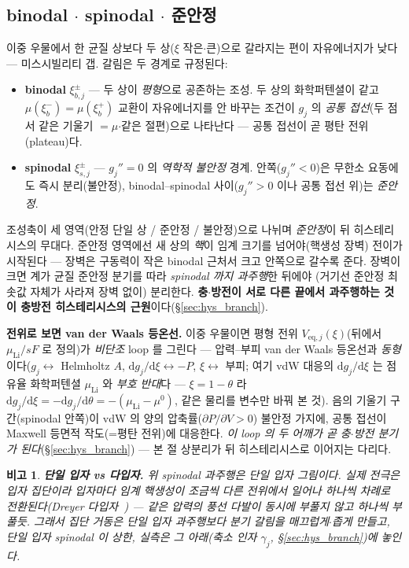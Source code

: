\documentclass[11pt,a4paper]{article}
\newtheorem*{flagbox}{비고}
\newcommand{\dd}{\mathrm{d}}
\newcommand{\eq}{\mathrm{eq}}
\begin{document}
\subsection{binodal $\cdot$ spinodal $\cdot$ 준안정}
이중 우물에서 한 균질 상보다 두 상($\xi$ 작은$\cdot$큰)으로 갈라지는 편이 자유에너지가 낮다 — 미스시빌리티 갭.
갈림은 두 경계로 규정된다:
\begin{itemize}[leftmargin=1.4em,itemsep=2pt]
\item \textbf{binodal} $\xi_{b,j}^\pm$ — 두 상이 \emph{평형}으로 공존하는 조성. 두 상의 화학퍼텐셜이 같고
  $\mu(\xi_b^-)=\mu(\xi_b^+)$ 교환이 자유에너지를 안 바꾸는 조건이 $g_j$ 의 \emph{공통 접선}(두 점서 같은 기울기
  $=\mu$$\cdot$같은 절편)으로 나타난다 — 공통 접선이 곧 평탄 전위(plateau)다.
\item \textbf{spinodal} $\xi_{s,j}^\pm$ — $g_j''=0$ 의 \emph{역학적 불안정} 경계. 안쪽($g_j''<0$)은 무한소 요동에도
  즉시 분리(불안정), binodal--spinodal 사이($g_j''>0$ 이나 공통 접선 위)는 \emph{준안정}.
\end{itemize}
조성축이 세 영역(안정 단일 상 / 준안정 / 불안정)으로 나뉘며 \emph{준안정}이 뒤 히스테리시스의 무대다. 준안정
영역에선 새 상의 \emph{핵}이 임계 크기를 넘어야(핵생성 장벽) 전이가 시작된다 — 장벽은 구동력이 작은 binodal
근처서 크고 안쪽으로 갈수록 준다. 장벽이 크면 계가 균질 준안정 분기를 따라 \emph{spinodal 까지 과주행}한 뒤에야
(거기선 준안정 최솟값 자체가 사라져 장벽 없이) 분리한다. \textbf{충$\cdot$방전이 서로 다른 끝에서 과주행하는 것이
충방전 히스테리시스의 근원}이다(\S\ref{sec:hys_branch}).

\textbf{전위로 보면 van der Waals 등온선.} 이중 우물이면 평형 전위 $V_{\eq,j}(\xi)$(뒤에서 $\mu_\mathrm{Li}/sF$ 로
정의)가 \emph{비단조} loop 를 그린다 — 압력--부피 van der Waals 등온선과 \emph{동형}이다($g_j\leftrightarrow$ Helmholtz
$A$, $\dd g_j/\dd\xi\leftrightarrow-P$, $\xi\leftrightarrow$ 부피; 여기 vdW 대응의 $\dd g_j/\dd\xi$ 는 점유율
화학퍼텐셜 $\mu_\mathrm{Li}$ 와 \emph{부호 반대}다 — $\xi=1-\theta$ 라 $\dd g_j/\dd\xi=-\dd g_j/\dd\theta=-(\mu_\mathrm{Li}-\mu^0)$,
같은 물리를 변수만 바꿔 본 것). 음의 기울기 구간(spinodal 안쪽)이 vdW 의 양의
압축률($\partial P/\partial V>0$) 불안정 가지에, 공통 접선이 Maxwell 등면적 작도(=평탄 전위)에 대응한다.
\emph{이 loop 의 두 어깨가 곧 충$\cdot$방전 분기가 된다}(\S\ref{sec:hys_branch}) — 본 절 상분리가 뒤 히스테리시스로
이어지는 다리다.
\begin{flagbox}
\textbf{단일 입자 vs 다입자.} 위 spinodal 과주행은 \emph{단일 입자} 그림이다. 실제 전극은 입자 집단이라 입자마다
임계 핵생성이 조금씩 다른 전위에서 일어나 \emph{하나씩 차례로} 전환된다(Dreyer 다입자~\cite{dreyer2010}) —
같은 압력의 풍선 다발이 동시에 부풀지 않고 하나씩 부풀듯. 그래서 집단 거동은 단일 입자 과주행보다 분기 갈림을
\emph{매끄럽게$\cdot$좁게} 만들고, 단일 입자 spinodal 이 \emph{상한}, 실측은 그 아래(축소 인자 $\gamma_j$,
\S\ref{sec:hys_branch})에 놓인다.
\end{flagbox}
\end{document}
